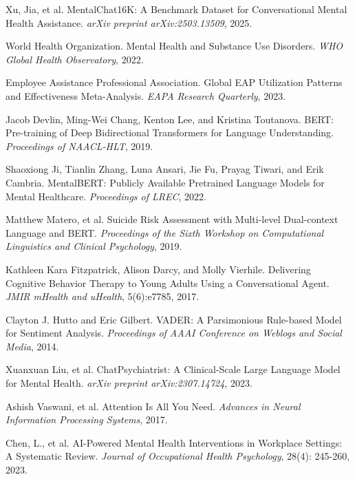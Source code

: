 \documentclass[11pt,twocolumn]{article}
\begin{document}
\begin{thebibliography}{20}

Xu, Jia, et al.
MentalChat16K: A Benchmark Dataset for Conversational Mental Health Assistance.
\textit{arXiv preprint arXiv:2503.13509}, 2025.

World Health Organization.
Mental Health and Substance Use Disorders.
\textit{WHO Global Health Observatory}, 2022.

Employee Assistance Professional Association.
Global EAP Utilization Patterns and Effectiveness Meta-Analysis.
\textit{EAPA Research Quarterly}, 2023.

Jacob Devlin, Ming-Wei Chang, Kenton Lee, and Kristina Toutanova.
BERT: Pre-training of Deep Bidirectional Transformers for Language Understanding.
\textit{Proceedings of NAACL-HLT}, 2019.

Shaoxiong Ji, Tianlin Zhang, Luna Ansari, Jie Fu, Prayag Tiwari, and Erik Cambria.
MentalBERT: Publicly Available Pretrained Language Models for Mental Healthcare.
\textit{Proceedings of LREC}, 2022.

Matthew Matero, et al.
Suicide Risk Assessment with Multi-level Dual-context Language and BERT.
\textit{Proceedings of the Sixth Workshop on Computational Linguistics and Clinical Psychology}, 2019.

Kathleen Kara Fitzpatrick, Alison Darcy, and Molly Vierhile.
Delivering Cognitive Behavior Therapy to Young Adults Using a Conversational Agent.
\textit{JMIR mHealth and uHealth}, 5(6):e7785, 2017.

Clayton J. Hutto and Eric Gilbert.
VADER: A Parsimonious Rule-based Model for Sentiment Analysis.
\textit{Proceedings of AAAI Conference on Weblogs and Social Media}, 2014.

Xuanxuan Liu, et al.
ChatPsychiatrist: A Clinical-Scale Large Language Model for Mental Health.
\textit{arXiv preprint arXiv:2307.14724}, 2023.

Ashish Vaswani, et al.
Attention Is All You Need.
\textit{Advances in Neural Information Processing Systems}, 2017.

Chen, L., et al.
AI-Powered Mental Health Interventions in Workplace Settings: A Systematic Review.
\textit{Journal of Occupational Health Psychology}, 28(4): 245-260, 2023.


\end{thebibliography}
\end{document}
